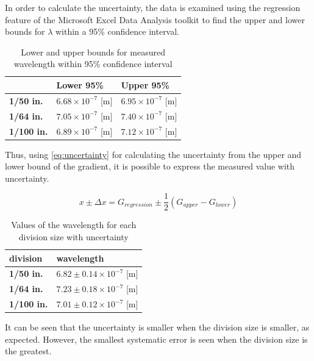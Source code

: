\documentclass{article}
\begin{document}
In order to calculate the uncertainty, the data is examined using the regression feature of the Microsoft Excel Data Analysis toolkit to find the upper and lower bounds for $\lambda$ within a 95\% confidence interval.

\begin{table}[H]
\begin{tabular}{|l|l|l|}
\hline
               & \textbf{Lower 95\%}    & \textbf{Upper 95\%}   \\ \hline
\textbf{1/50 in.}  & $6.68 \times 10^{-7}$ [m] & $6.95 \times 10^{-7}$ [m] \\ \hline
\textbf{1/64 in.}  & $7.05 \times 10^{-7}$ [m] & $7.40 \times 10^{-7}$ [m] \\ \hline
\textbf{1/100 in.} & $6.89 \times 10^{-7}$ [m]  & $7.12 \times 10^{-7}$ [m] \\ \hline
\end{tabular}
\caption{Lower and upper bounds for measured wavelength within 95\% confidence interval}
\label{tb:lambda}
\end{table}

Thus, using \eqref{eq:uncertainty} \autocite{Palmer} for calculating the uncertainty from the upper and lower bound of the gradient, it is possible to express the measured value with uncertainty.

\begin{equation}\label{eq:uncertainty}
  x \pm \Delta x = G_{regression}  \pm \frac{1}{2} (G_{upper} - G_{lower})
\end{equation}

\begin{table}[H]
\begin{tabular}{|l|l|}
\hline
\textbf{division}  & \textbf{wavelength}                 \\ \hline
\textbf{1/50 in.}  & $6.82 \pm 0.14 \times 10^{-7}$ [m] \\ \hline
\textbf{1/64 in.}  & $7.23 \pm 0.18 \times 10^{-7}$ [m] \\ \hline
\textbf{1/100 in.} & $7.01 \pm 0.12 \times 10^{-7}$ [m] \\ \hline
\end{tabular}
\caption{Values of the wavelength for each division size with uncertainty}
\label{tb:result}
\end{table}

It can be seen that the uncertainty is smaller when the division size is smaller, as expected. However, the smallest systematic error is seen when the division size is the greatest.
\end{document}
